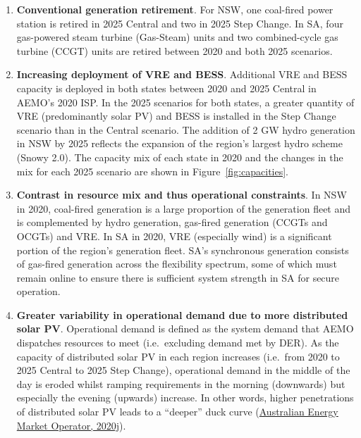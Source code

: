 \documentclass[12pt,a4paper,]{report}
\providecommand{\tightlist}{%
  \setlength{\itemsep}{0pt}\setlength{\parskip}{0pt}}
\begin{document}
\begin{enumerate}
\def\labelenumi{\arabic{enumi}.}
\tightlist
\item
  \textbf{Conventional generation retirement}. For NSW, one coal-fired
  power station is retired in 2025 Central and two in 2025 Step Change.
  In SA, four gas-powered steam turbine (Gas-Steam) units and two
  combined-cycle gas turbine (CCGT) units are retired between 2020 and
  both 2025 scenarios.
\item
  \textbf{Increasing deployment of VRE and BESS}. Additional VRE and
  BESS capacity is deployed in both states between 2020 and 2025 Central
  in AEMO's 2020 ISP. In the 2025 scenarios for both states, a greater
  quantity of VRE (predominantly solar PV) and BESS is installed in the
  Step Change scenario than in the Central scenario. The addition of 2
  GW hydro generation in NSW by 2025 reflects the expansion of the
  region's largest hydro scheme (Snowy 2.0). The capacity mix of each
  state in 2020 and the changes in the mix for each 2025 scenario are
  shown in Figure~\ref{fig:capacities}.
\item
  \textbf{Contrast in resource mix and thus operational constraints}. In
  NSW in 2020, coal-fired generation is a large proportion of the
  generation fleet and is complemented by hydro generation, gas-fired
  generation (CCGTs and OCGTs) and VRE. In SA in 2020, VRE (especially
  wind) is a significant portion of the region's generation fleet. SA's
  synchronous generation consists of gas-fired generation across the
  flexibility spectrum, some of which must remain online to ensure there
  is sufficient system strength in SA for secure operation.
\item
  \textbf{Greater variability in operational demand due to more
  distributed solar PV}. Operational demand is defined as the system
  demand that AEMO dispatches resources to meet (i.e.~excluding demand
  met by DER). As the capacity of distributed solar PV in each region
  increases (i.e.~from 2020 to 2025 Central to 2025 Step Change),
  operational demand in the middle of the day is eroded whilst ramping
  requirements in the morning (downwards) but especially the evening
  (upwards) increase. In other words, higher penetrations of distributed
  solar PV leads to a ``deeper'' duck curve
  (\protect\hyperlink{ref-australianenergymarketoperatorRenewableIntegrationStudy2020b}{Australian
  Energy Market Operator, 2020j}).
\end{enumerate}
\end{document}
